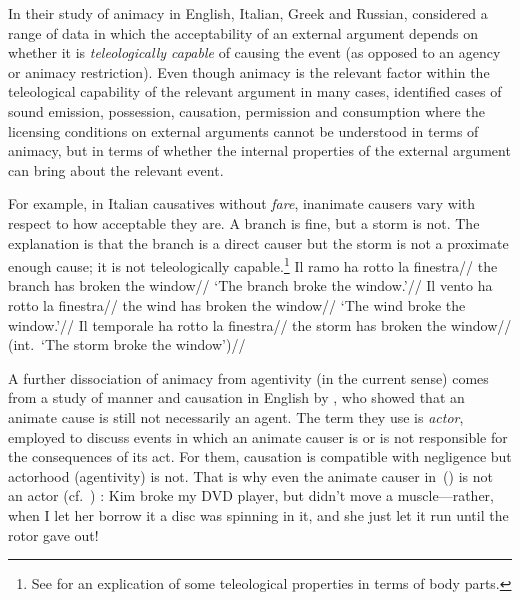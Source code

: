 {In their study of animacy in English, Italian, Greek and Russian, \cite{folliharley08} considered a range of data in which the acceptability of an external argument depends on whether it is \emph{teleologically capable} of causing the event (as opposed to an agency or animacy restriction). Even though animacy is the relevant factor within the teleological capability of the relevant argument in many cases, \cite{folliharley08} identified cases of sound emission, possession, causation, permission and consumption where the licensing conditions on external arguments cannot be understood in terms of animacy, but in terms of whether the internal properties of the external argument can bring about the relevant event.

For example, in Italian causatives without \emph{fare}, inanimate causers vary with respect to how acceptable they are. A branch is fine, but a storm is not. The explanation is that the branch is a direct causer but the storm is not a proximate enough cause; it is not teleologically capable.\footnote{See \cite{irwin19tlr} for an explication of some teleological properties in terms of body parts.}
\pex
	\a \begingl
		\gla Il ramo ha rotto la finestra//
		\glb the branch has broken the window//
		\glft `The branch broke the window.'//
		\endgl
	\a \begingl
		\gla {}Il vento ha rotto la finestra//
		\glb the wind has broken the window//
		\glft `The wind broke the window.'//
		\endgl
	\a \begingl
		\gla \ljudge{\#}Il temporale ha rotto la finestra//
		\glb the storm has broken the window//
		\glft (int.~`The storm broke the window')//
		\endgl
\xe		

A further dissociation of animacy from agentivity (in the current sense) comes from a study of manner and causation in English by \cite{beaverskoontzgarboden12}, who showed that an animate cause is still not necessarily an agent. The term they use is \emph{actor}, employed to discuss events in which an animate causer is or is not responsible for the consequences of its act. For them, causation is compatible with negligence but actorhood (agentivity) is not. That is why even the animate causer in~(\nextx) is not an actor (cf.~\citealt{rappaporthovav14}) :
\ex Kim broke my DVD player, but didn’t move a muscle—rather, when I let her borrow it a disc was spinning in it, and she just let it run until the rotor gave out!
\xe

}
